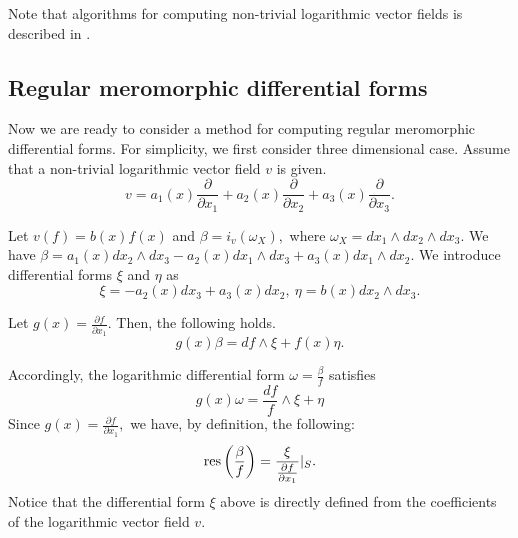 \documentclass[pdftex]{arxsigma}
\begin{document}
Note that algorithms for computing non-trivial logarithmic vector fields is described in \cite{TN20}. 

\subsection{Regular meromorphic differential forms}

Now we are ready to consider a method for computing regular meromorphic differential forms. For simplicity, we first consider three dimensional case. 
 Assume that a non-trivial logarithmic vector field $v$ is given.
\begin{equation*}
v=a_1(x)\frac{\partial}{\partial x_1} + a_2(x)\frac{\partial}{\partial x_2}+a_3(x)\frac{\partial}{\partial x_3}.
\end{equation*}

Let $ v(f)=b(x)f(x) $ and $ \beta=i_v(\omega_X), $ where $\omega_X=dx_1\wedge dx_2\wedge dx_3.$
We have $ \beta=a_1(x)dx_2\wedge dx_3-a_2(x)dx_1\wedge dx_3+a_3(x)dx_1\wedge dx_2. $
We introduce differential forms $ \xi$ and $\eta$ as
\begin{equation*}
\xi=-a_2(x)dx_3+a_3(x)dx_2, \ \eta =b(x)dx_2\wedge dx_3.
\end{equation*}

Let $g(x)=\frac{\partial f}{\partial x_1}. $ Then, the following holds.
\begin{equation*}
g(x)\beta= df \wedge \xi + f(x)\eta. 
\end{equation*}

Accordingly, the logarithmic differential form $ \omega=\frac{\beta}{f} $ satisfies 
\begin{equation*}
g(x)\omega=\frac{df}{f} \wedge \xi + \eta 
\end{equation*}
Since $ g(x) = \frac{\partial f}{\partial x_1}, $ we have, by definition, the following:
\begin{equation*}
{\rm res}\left(\frac{\beta}{f}\right) = \frac{\xi}{\frac{\partial f}{\partial x_1}}|_S. 
\end{equation*}
Notice that the differential form  $ \xi$ above is directly defined from the coefficients of  the logarithmic vector field $v$.
\end{document}
